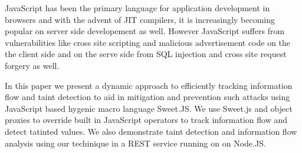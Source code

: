 JavaScript has been the primary language for application development in browsers and with the advent of JIT compilers, it is increasingly becoming popular on server side developement as well. However JavaScript suffers from vulnerabilities like cross site scripting and malicious advertisement code on the the client side and on the serve side from SQL injection and cross site request forgery as well.

In this paper we present a dynamic approach to efficiently tracking information flow and taint detection to aid in mitigation and prevention such attacks using JavaScript based hygenic macro language Sweet.JS. We use Sweet.js and object proxies to override built in JavaScript operators to track information flow and detect tatinted values. We also demonstrate taint detection and information flow analysis using our techinique in a REST service running on on Node.JS.